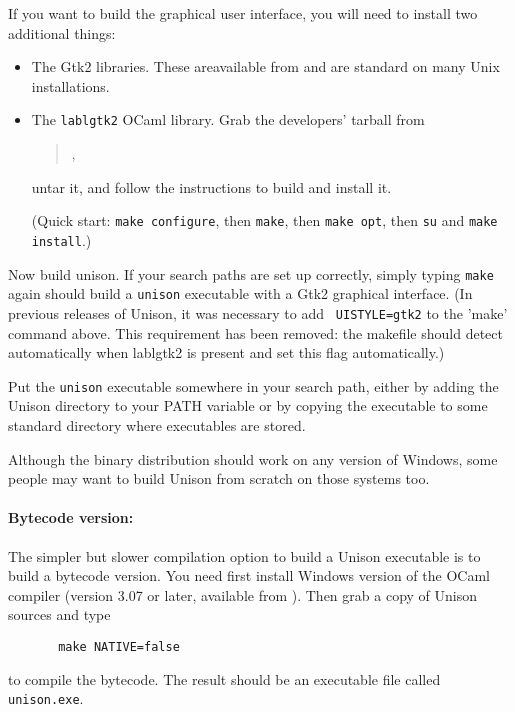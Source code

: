 \documentclass{article}
\begin{document}
If you want to build the graphical user interface, you will need to install
two additional things:
\begin{itemize}
\item The Gtk2 libraries.  These areavailable from
   and are standard on many Unix installations.   
  
\item The {\tt lablgtk2} OCaml library.  Grab the
  developers' tarball from
  \begin{quote}
  ,
  \end{quote}
  untar it, and follow the instructions to build and install it.

  (Quick start: {\tt make configure}, then {\tt make}, then {\tt make
  opt}, then {\tt su} and {\tt make install}.)
\end{itemize}

Now build unison.  If your search paths are set up correctly, simply typing
{\tt make}
again should build a \verb|unison| executable with a Gtk2 graphical
interface.  (In previous releases of Unison, it was necessary to add {\tt
  UISTYLE=gtk2} to the 'make' command above.  This requirement has been
removed: the makefile should detect automatically when lablgtk2 is
present and set this flag automatically.)  

Put the \verb|unison| executable somewhere in your search path, either
by adding the Unison directory to your PATH variable or by copying the
executable to some standard directory where executables are stored.


Although the binary distribution should work on any version of Windows,
some people may want to build Unison from scratch on those systems too.

\paragraph{Bytecode version:} The simpler but slower compilation option
to build a Unison executable is to build a bytecode version.  You need
first install Windows version of the OCaml compiler (version 3.07 or
later, available from ).  Then grab a copy
of Unison sources and type  
\begin{verbatim}
       make NATIVE=false
\end{verbatim}
to compile the bytecode.  The result should be an executable file called
\verb|unison.exe|. 
\end{document}
